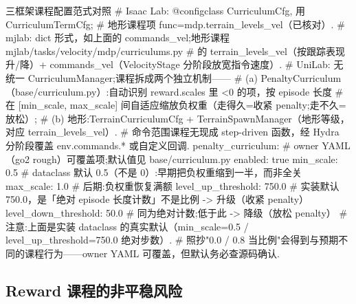 \begin{codebox}[Python]{三框架课程配置范式对照}
# Isaac Lab: @configclass CurriculumCfg, 用 CurriculumTermCfg;
#   地形课程项 func=mdp.terrain_levels_vel（已核对）.
# mjlab: dict 形式，如上面的 commands_vel;地形课程 mjlab/tasks/velocity/mdp/curriculums.py
#   的 terrain_levels_vel（按跟踪表现升/降）+ commands_vel（VelocityStage 分阶段放宽指令速度）.
# UniLab: 无统一 CurriculumManager;课程拆成两个独立机制——
#   (a) PenaltyCurriculum（base/curriculum.py）:自动识别 reward.scales 里 <0 的项，按 episode 长度
#       在 [min_scale, max_scale] 间自适应缩放负权重（走得久=收紧 penalty;走不久=放松）;
#   (b) 地形:TerrainCurriculumCfg + TerrainSpawnManager（地形等级，对应 terrain_levels_vel）.
#   命令范围课程无现成 step-driven 函数，经 Hydra 分阶段覆盖 env.commands.* 或自定义回调.
penalty_curriculum:                  # owner YAML（go2 rough）可覆盖项;默认值见 base/curriculum.py
  enabled: true
  min_scale: 0.5                     # dataclass 默认 0.5（不是 0）:早期把负权重缩到一半，而非全关
  max_scale: 1.0                     # 后期:负权重恢复满额
  level_up_threshold: 750.0          # 实装默认 750.0，是「绝对 episode 长度计数」不是比例 -> 升级（收紧 penalty）
  level_down_threshold: 50.0         # 同为绝对计数;低于此 -> 降级（放松 penalty）
# 注意:上面是实装 dataclass 的真实默认（min_scale=0.5 / level_up_threshold=750.0 绝对步数）.
#   照抄"0.0 / 0.8 当比例"会得到与预期不同的课程行为——owner YAML 可覆盖，但默认务必查源码确认.
\end{codebox}


\subsection{Reward 课程的非平稳风险}
\label{sec:rlmc-rew-nonstationary}

